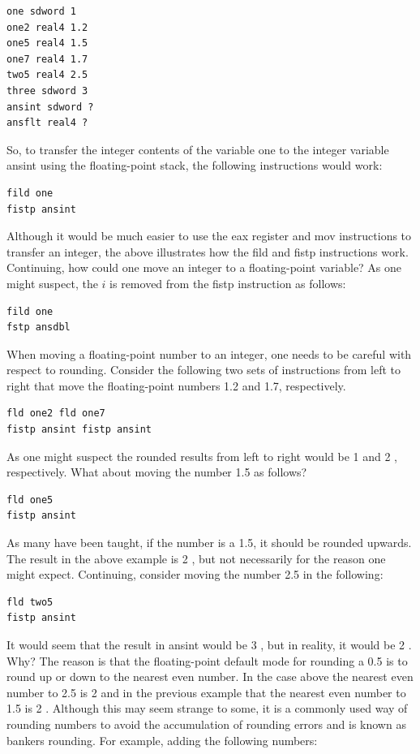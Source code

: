 \documentclass[10pt]{article}
\begin{document}
\begin{verbatim}
one sdword 1
one2 real4 1.2
one5 real4 1.5
one7 real4 1.7
two5 real4 2.5
three sdword 3
ansint sdword ?
ansflt real4 ?
\end{verbatim}

So, to transfer the integer contents of the variable one to the integer variable ansint using the floating-point stack, the following instructions would work:

\begin{verbatim}
fild one
fistp ansint
\end{verbatim}

Although it would be much easier to use the eax register and mov instructions to transfer an integer, the above illustrates how the fild and fistp instructions work. Continuing, how could one move an integer to a floating-point variable? As one might suspect, the $i$ is removed from the fistp instruction as follows:

\begin{verbatim}
fild one
fstp ansdbl
\end{verbatim}

When moving a floating-point number to an integer, one needs to be careful with respect to rounding. Consider the following two sets of instructions from left to right that move the floating-point numbers 1.2 and 1.7, respectively.

\begin{verbatim}
fld one2 fld one7
fistp ansint fistp ansint
\end{verbatim}

As one might suspect the rounded results from left to right would be 1 and 2 , respectively. What about moving the number 1.5 as follows?

\begin{verbatim}
fld one5
fistp ansint
\end{verbatim}

As many have been taught, if the number is a 1.5, it should be rounded upwards. The result in the above example is 2 , but not necessarily for the reason one might expect. Continuing, consider moving the number 2.5 in the following:

\begin{verbatim}
fld two5
fistp ansint
\end{verbatim}

It would seem that the result in ansint would be 3 , but in reality, it would be 2 . Why? The reason is that the floating-point default mode for rounding a 0.5 is to round up or down to the nearest even number. In the case above the nearest even number to 2.5 is 2 and in the previous example that the nearest even number to 1.5 is 2 . Although this may seem strange to some, it is a commonly used way of rounding numbers to avoid the accumulation of rounding errors and is known as bankers rounding. For example, adding the following numbers:
\end{document}
